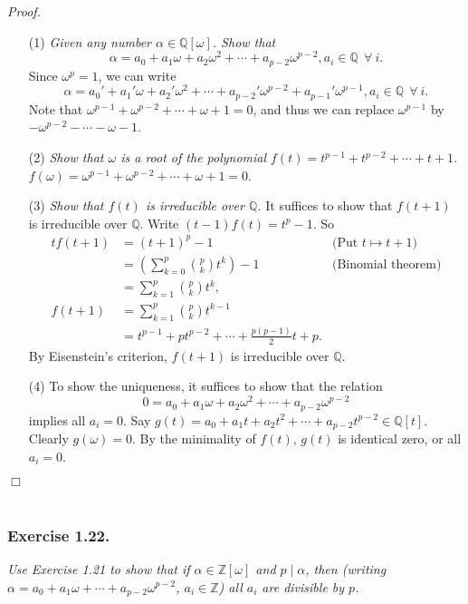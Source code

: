 \documentclass{article}
\begin{document}
\emph{Proof.}
\begin{enumerate}
\item[(1)]
\emph{Given any number $\alpha \in \mathbb{Q}[\omega]$.
Show that}
$$\alpha = a_0 + a_1\omega + a_2\omega^2 + \cdots + a_{p-2}\omega^{p-2},
a_i \in \mathbb{Q} \:\: \forall \: i.$$
Since $\omega^p = 1$, we can write
$$\alpha = a_0' + a_1'\omega + a_2'\omega^2 + \cdots + a_{p-2}'\omega^{p-2} + a_{p-1}'\omega^{p-1},
a_i \in \mathbb{Q} \:\: \forall \: i.$$
Note that $\omega^{p-1} + \omega^{p-2} + \cdots + \omega + 1 = 0$,
and thus we can replace $\omega^{p-1}$
by $- \omega^{p-2} - \cdots - \omega - 1$.
\item[(2)]
\emph{Show that $\omega$ is a root of the polynomial
$f(t) = t^{p-1} + t^{p-2} + \cdots + t + 1$.}
$f(\omega) = \omega^{p-1} + \omega^{p-2} + \cdots + \omega + 1 = 0$.
\item[(3)]
\emph{Show that $f(t)$ is irreducible over $\mathbb{Q}$.}
It suffices to show that $f(t+1)$ is irreducible over $\mathbb{Q}$.
Write $(t-1)f(t) = t^p - 1$. So
\begin{align*}
tf(t+1)
&= (t+1)^p - 1
  &\text{(Put $t \mapsto t+1$)} \\
&= \left( \sum_{k=0}^{p}{p \choose k}t^k \right) - 1
  &\text{(Binomial theorem)} \\
&= \sum_{k=1}^{p}{p \choose k}t^k, \\
f(t+1)
&= \sum_{k=1}^{p}{p \choose k}t^{k-1} \\
&= t^{p-1} + p t^{p-2} + \cdots + \frac{p(p-1)}{2} t + p.
\end{align*}
By Eisenstein's criterion, $f(t+1)$ is irreducible over $\mathbb{Q}$.
\item[(4)]
To show the uniqueness, it suffices to show that the relation
$$0 = a_0 + a_1\omega + a_2\omega^2 + \cdots + a_{p-2}\omega^{p-2}$$
implies all $a_i = 0$.
Say $g(t) = a_0 + a_1 t + a_2 t^2 + \cdots + a_{p-2} t^{p-2} \in \mathbb{Q}[t]$.
Clearly $g(\omega) = 0$. By the minimality of $f(t)$, $g(t)$ is identical zero,
or all $a_i = 0$.
\end{enumerate}
$\Box$ \\\\






\subsubsection*{Exercise 1.22.}
\emph{Use Exercise 1.21 to show that if
$\alpha \in \mathbb{Z}[\omega]$ and $p \mid \alpha$,
then (writing $\alpha = a_0 + a_1 \omega + \cdots + a_{p-2} \omega^{p-2}$,
$a_i \in \mathbb{Z}$) all $a_i$ are divisible by $p$. } \\
\end{document}
